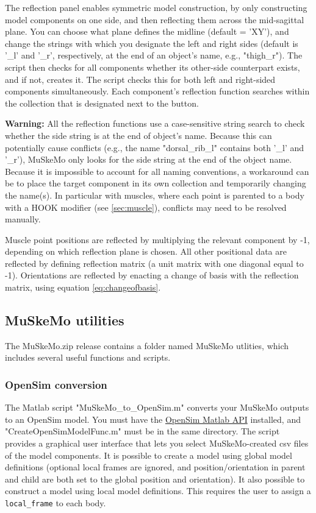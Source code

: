 \documentclass{article}
\begin{document}
The reflection panel enables symmetric model construction, by only constructing model components on one side, and then reflecting them across the mid-sagittal plane. You can choose what plane defines the midline (default = 'XY'), and change the strings with which you designate the left and right sides (default is '\_l' and '\_r', respectively, at the end of an object's name, e.g., "thigh\_r"). The script then checks for all components whether its other-side counterpart exists, and if not, creates it. The script checks this for both left and right-sided components simultaneously. Each component's reflection function searches within the collection that is designated next to the button.

\textbf{Warning:} All the reflection functions use a case-sensitive string search to check whether the side string is at the end of object's name. Because this can potentially cause conflicts (e.g., the name "dorsal\_rib\_l" contains both '\_l' and '\_r'), MuSkeMo only looks for the side string at the end of the object name. Because it is impossible to account for all naming conventions, a workaround can be to place the target component in its own collection and temporarily changing the name(s). In particular with muscles, where each point is parented to a body with a HOOK modifier (see \ref{sec:muscle}), conflicts may need to be resolved manually.

Muscle point positions are reflected by multiplying the relevant component by -1, depending on which reflection plane is chosen. All other positional data are reflected by defining reflection matrix (a unit matrix with one diagonal equal to -1). Orientations are reflected by enacting a change of basis with the reflection matrix, using equation \ref{eq:changeofbasis}.

\subsection{MuSkeMo utilities}
\label{sec:muskemoutilities}

The MuSkeMo.zip release contains a folder named MuSkeMo utlities, which includes several useful functions and scripts. 

\subsubsection{OpenSim conversion}
The Matlab script "MuSkeMo\_to\_OpenSim.m" converts your MuSkeMo outputs to an OpenSim model. You must have the \href{https://opensimconfluence.atlassian.net/wiki/spaces/OpenSim/pages/53089380/Scripting+with+Matlab}{OpenSim Matlab API} installed, and "CreateOpenSimModelFunc.m" must be in the same directory. The script provides a graphical user interface that lets you select MuSkeMo-created csv files of the model components. It is possible to create a model using global model definitions (optional local frames are ignored, and position/orientation in parent and child are both set to the global position and orientation). It also possible to construct a model using local model definitions. This requires the user to assign a  \texttt{local\_frame} to each body. 
\end{document}
